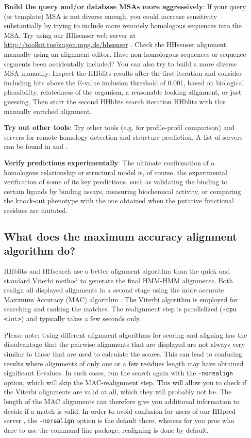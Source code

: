 \documentclass[11pt,a4paper]{article}
\begin{document}
{\bf Build the query and/or database MSAs more aggressively}:
If your query (or template) MSA is not diverse enough, you could increase sensitivity substantially by trying to include more remotely homologous sequences into the MSA. Try using our HHsenser web server at \url{http://toolkit.tuebingen.mpg.de/hhsenser} \cite{Soding:2006b}. Check the HHsenser alignment manually using an alignment editor. Have non-homologous sequences or sequence segments been accidentally included? You can also try to build a more diverse MSA manually: Inspect the HHblits results after the first iteration and consider including hits above the E-value inclusion threshold of 0.001, based on biological plausibility, relatedness of the organism, a reasonable looking alignment, or just guessing. Then start the second HHblits search iteration HHblits with this manually enriched alignment. 

{\bf Try out other tools}:
Try other tools (e.g. for profile-profil comparison) and servers for remote homology detection and structure prediction. 
A list of servers can be found in \cite{Mariani:2011} and \cite{Battey:2007}.

{\bf Verify predictions experimentally}: 
The ultimate confirmation of a homologous relationship or structural model is, of course, the experimental verification of some of its key predictions, such as validating the binding to certain ligands by binding assays, measuring biochemical activity, or comparing the knock-out phenotype with the one obtained when the putative functional residues are mutated.


\subsection{What does the maximum accuracy alignment algorithm do?} \label{MAC}
HHblits and HHsearch use a better alignment algorithm than the quick and 
standard Viterbi method to generate the final HMM-HMM alignments. Both realign
all displayed alignments in a second stage using the more accurate Maximum Accuracy 
(MAC) algorithm \cite{Durbin:2008,Biegert:2008}. The Viterbi algorithm is employed 
for searching and ranking the matches. The realignment step is parallelized 
(\verb`-cpu <int>`) and typically takes a few seconds only.    

Please note: Using different alignment algorithms for scoring and aligning has the 
disadvantage that the pairwise alignments that are displayed are not always very similar to 
those that are used to calculate the scores. This can lead to confusing results 
where alignments of only one or a few residues length may have obtained significant
E-values. In such cases, run the search again with the \verb`-norealign` option, which will 
skip the MAC-realignment step. This will allow you to check if the Viterbi alignments 
are valid at all, which they will probably not be. The length of the MAC alignments 
can therefore give you additional information to decide if a match is valid. In order
to avoid confusion for users of our HHpred server \cite{Soding:2005b, Hildebrand:2009}, 
the \verb`-norealign` option is the default there, whereas for you pros who dare to use 
the command line package, realigning is done by default.
\end{document}
